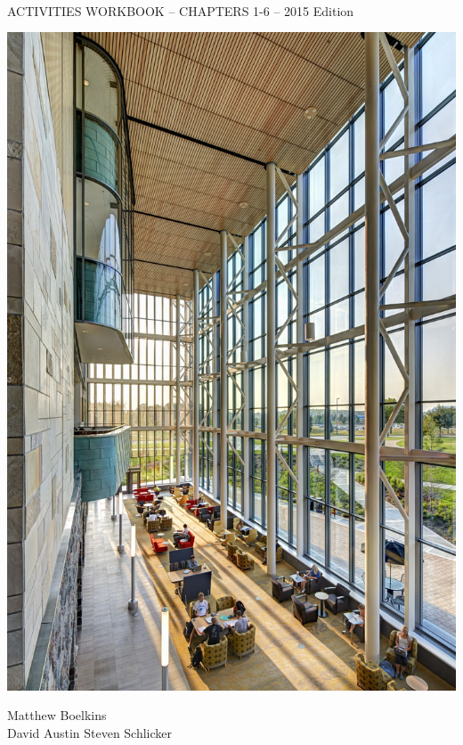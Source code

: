 \documentclass{article}
\begin{document}
\color{covergreen}
\begin{center}
\fontsize{32pt}{48pt}\selectfont{} \\[8pt]
\fontsize{12pt}{14pt}\selectfont ACTIVITIES WORKBOOK -- CHAPTERS 1-6 -- 2015 Edition\\[10pt]
\end{center}
\begin{center}
\includegraphics[scale=.8]{ActiveCalculusCover.jpg}
\end{center}
\begin{center}
\fontsize{24pt}{32pt}\selectfont Matthew Boelkins\\
\fontsize{18pt}{24pt}\selectfont David Austin \quad Steven Schlicker
\end{center}
\end{document}
